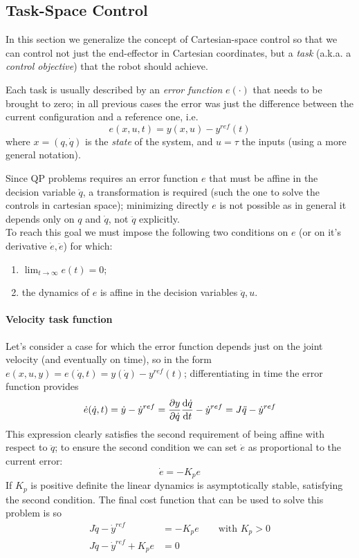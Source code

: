 	
	
\subsection{Task-Space Control}
	In this section we generalize the concept of Cartesian-space control so that we can control not just the end-effector in Cartesian coordinates, but a \textit{task} (a.k.a. a \textit{control objective}) that the robot should achieve.
	
	Each task is usually described by an \textit{error function} $e(\cdot)$ that needs to be brought to zero; in all previous cases the error was just the difference between the current configuration and a reference one, i.e.
	\begin{equation}
		e(x,u,t) = y(x,u) - y^{ref}(t)
	\end{equation}
	where $x = (q,\dot q)$ is the \textit{state} of the system, and $u=\tau$ the inputs (using a more general notation).
	
	Since QP problems requires an error function $e$ that must be affine in the decision variable $\ddot q$, a transformation is required (such the one to solve the controls in cartesian space); minimizing directly $e$ is not possible as in general it depends only on $q$ and $\dot q$, not $\ddot q$ explicitly.\\
	To reach this goal we must impose the following two conditions on $e$ (or on it's derivative $\dot e,\ddot e$) for which:
	\begin{enumerate}
		\item $\lim_{t\rightarrow \infty} e(t) = 0$;
		\item the dynamics of $e$ is affine in the decision variables $\ddot q, u$.
	\end{enumerate}
	
	\paragraph{Velocity task function} Let's consider a case for which the error function depends just on the joint velocity (and eventually on time), so in the form $e(x,u,y) = e(\dot q, t) = y(\dot q) - y^{ref}(t)$; differentiating in time the error function provides
	\[ \dot e(\dot q, t) = \dot y - \dot y^{ref} = \frac{\partial y}{\partial \dot q} \frac{\mathrm{d} \dot q}{\mathrm{d} t} - \dot y^{ref} = J \ddot q - \dot y^{ref} \]
	This expression clearly satisfies the second requirement of being affine with respect to $\ddot q$; to ensure the second condition we can set $\dot e$ as proportional to the current error:
	\[ \dot e = -K_p e \]
	If $K_p$ is positive definite the linear dynamics is asymptotically stable, satisfying the second condition. The final cost function that can be used to solve this problem is so
	\begin{equation} 
	\begin{aligned} 
		J \ddot q - \dot y^{ref} & = - K_p e \qquad \textrm{with } K_p > 0 \\ 
		J\ddot q - \dot y^{ref} + K_p e & = 0
	\end{aligned}
	\end{equation}
	
